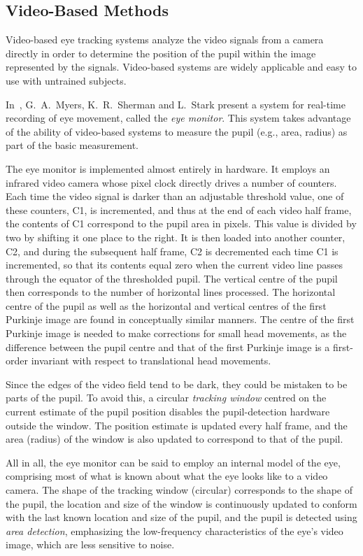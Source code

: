 \subsection{Video-Based Methods}
\label{back:track:monitor}

Video-based eye tracking systems analyze the video signals from a
camera directly in order to determine the position of the pupil within
the image represented by the signals.  Video-based systems are widely
applicable and easy to use with untrained subjects.

In~\cite{monitor}, G.\ A.\ Myers, K.\ R.\ Sherman and L.\ Stark
present a system for real-time recording of eye movement, called the
{\em eye monitor\/}.  This system takes advantage of the ability of
video-based systems to measure the pupil (e.g., area, radius) as part
of the basic measurement.

The eye monitor is implemented almost entirely in hardware.  It
employs an infrared video camera whose pixel clock directly drives a
number of counters.  Each time the video signal is darker than an
adjustable threshold value, one of these counters, C1, is incremented,
and thus at the end of each video half frame, the contents of C1
correspond to the pupil area in pixels.  This value is divided by two
by shifting it one place to the right.  It is then loaded into another
counter, C2, and during the subsequent half frame, C2 is decremented
each time C1 is incremented, so that its contents equal zero when the
current video line passes through the equator of the thresholded
pupil.  The vertical centre of the pupil then corresponds to the
number of horizontal lines processed.  The horizontal centre of the
pupil as well as the horizontal and vertical centres of the first
Purkinje image are found in conceptually similar manners.  The centre
of the first Purkinje image is needed to make corrections for small
head movements, as the difference between the pupil centre and that of
the first Purkinje image is a first-order invariant with respect to
translational head movements.

Since the edges of the video field tend to be dark, they could be
mistaken to be parts of the pupil.  To avoid this, a circular {\em
  tracking window\/} centred on the current estimate of the pupil
position disables the pupil-detection hardware outside the window.
The position estimate is updated every half frame, and the area
(radius) of the window is also updated to correspond to that of the
pupil.

All in all, the eye monitor can be said to employ an internal model of
the eye, comprising most of what is known about what the eye looks
like to a video camera.  The shape of the tracking window (circular)
corresponds to the shape of the pupil, the location and size of the
window is continuously updated to conform with the last known location
and size of the pupil, and the pupil is detected using {\em area
  detection\/}, emphasizing the low-frequency characteristics of the
eye's video image, which are less sensitive to noise.

